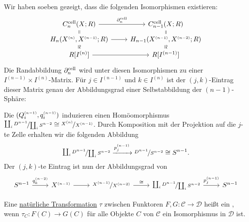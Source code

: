 \begin{bemerkung}[{name=[{Matrixform der zellulären Randabbildung}]}]
	Wir haben soeben gezeigt, dass die folgenden Isomorphismen existieren:
	\[
		\begin{tikzcd}[row sep=tiny]
			C_n^{\cell}(X;R) \arrow[draw=none]{d}[sloped,auto=false]{=} \rar["\partial_n^{\cell}"] & C_{n-1}^{\cell}(X;R) \arrow[draw=none]{d}[sloped,auto=false]{=}\\
			H_n \enbrace*{X^\ssbrace{n},X^\ssbrace{n-1};R} \rar \arrow[draw=none]{d}[sloped,auto=false]{\cong}
			& H_{n-1} \enbrace*{X^\ssbrace{n-1},X^\ssbrace{n-2};R} \arrow[draw=none]{d}[sloped,auto=false]{\cong}\\
			R[I^{(n)}] \rar & R[I^{(n-1)}]  
		\end{tikzcd}
	\]
	Die Randabbildung $\partial_n^{\operatorname{cell}}$ wird unter diesen Isomorphismen zu einer $I^{(n-1)} \times I^{(n)}$-Matrix. Für $j \in I^{(n-1)}$ und $k \in I^{(n)}$ ist der 
	$(j,k)$-Eintrag dieser Matrix genau der Abbildungsgrad einer Selbstabbildung der $(n-1)$-Sphäre: 

	Die $(Q_i^{\scriptscriptstyle(n-1)}, q_i^{\scriptscriptstyle(n-1)})$ induzieren einen Homöomorphismus
	$\nicefrac{\coprod_i D^{n-1}}{\coprod_i S^{n-2}} \cong \nicefrac{X^{\scriptscriptstyle(n)}}{X^{\scriptscriptstyle(n-1)}}$. Durch Komposition mit der Projektion auf die $j$-te Zelle erhalten 
	wir die folgenden Abbildung
	\[
		\nicefrac{\coprod_i D^{n-1}}{\coprod_i S^{n-2}} \xrightarrow{p_j^{(n-1)}}  \nicefrac{D^{n-1}}{S^{n-2}} \cong S^{n-1}.
	\] 
	Der $(j,k)$-te Eintrag ist nun der 
	Abbildungsgrad von 
	\[
		\begin{tikzcd}
			S^{n-1} \rar["q^{(n-2)}_k"] & X^\ssbrace{n-1} \rar & \nicefrac{X^\ssbrace{n-1}}{X^\ssbrace{n-2}} \rar["\cong"] & \nicefrac{\coprod_i D^{n-1}}{\coprod_i S^{n-2}} \rar["p_j^{(n-1)}"]
			& S^{n-1}
		\end{tikzcd}
	\]
\end{bemerkung}

\begin{definition}[{name=[natürlicher Isomorphismus]}]
	Eine \hyperref[def:16]{natürliche Transformation} $\tau$ zwischen Funktoren $F,G\colon \mathcal{C} \to \mathcal{D}$ heißt ein , wenn $\tau_C \colon F(C) \to G(C)$ für alle Objekte $C$ von $\mathcal{C}$ ein Isomorphismus in $\mathcal{D}$ ist.
\end{definition}

